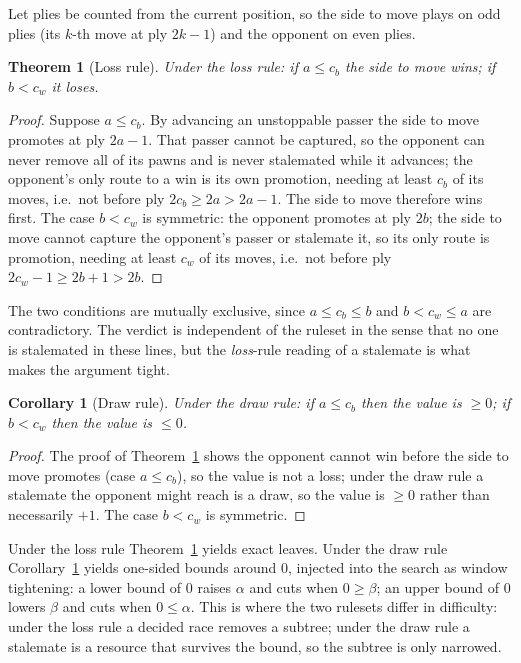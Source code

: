 \documentclass[11pt]{article}
\theoremstyle{plain}
\newtheorem{theorem}{Theorem}
\newtheorem{corollary}{Corollary}
\theoremstyle{definition}
\begin{document}
Let plies be counted from the current position, so the side to move plays on odd
plies (its $k$-th move at ply $2k-1$) and the opponent on even plies.

\begin{theorem}[Loss rule]\label{thm:race}
Under the loss rule: if $a\le c_b$ the side to move wins; if $b<c_w$ it loses.
\end{theorem}

\begin{proof}
Suppose $a\le c_b$. By advancing an unstoppable passer the side to move promotes
at ply $2a-1$. That passer cannot be captured, so the opponent can never remove
all of its pawns and is never stalemated while it advances; the opponent's only
route to a win is its own promotion, needing at least $c_b$ of its moves, i.e.\
not before ply $2c_b\ge 2a>2a-1$. The side to move therefore wins first. The case
$b<c_w$ is symmetric: the opponent promotes at ply $2b$; the side to move cannot
capture the opponent's passer or stalemate it, so its only route is promotion,
needing at least $c_w$ of its moves, i.e.\ not before ply $2c_w-1\ge 2b+1>2b$.
\end{proof}

The two conditions are mutually exclusive, since $a\le c_b\le b$ and $b<c_w\le a$
are contradictory. The verdict is independent of the ruleset in the sense that no
one is stalemated in these lines, but the \emph{loss}-rule reading of a stalemate
is what makes the argument tight.

\begin{corollary}[Draw rule]\label{cor:racebounds}
Under the draw rule: if $a\le c_b$ then the value is $\ge 0$; if $b<c_w$ then the
value is $\le 0$.
\end{corollary}

\begin{proof}
The proof of Theorem~\ref{thm:race} shows the opponent cannot win before the
side to move promotes (case $a\le c_b$), so the value is not a loss; under the
draw rule a stalemate the opponent might reach is a draw, so the value is $\ge 0$
rather than necessarily $+1$. The case $b<c_w$ is symmetric.
\end{proof}

Under the loss rule Theorem~\ref{thm:race} yields exact leaves. Under the draw
rule Corollary~\ref{cor:racebounds} yields one-sided bounds around $0$, injected
into the search as window tightening: a lower bound of $0$ raises $\alpha$ and
cuts when $0\ge\beta$; an upper bound of $0$ lowers $\beta$ and cuts when
$0\le\alpha$. This is where the two rulesets differ in difficulty: under the loss
rule a decided race removes a subtree; under the draw rule a stalemate is a
resource that survives the bound, so the subtree is only narrowed.
\end{document}
